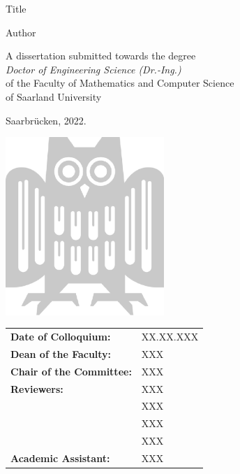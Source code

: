 \begin{titlepage}
\begin{center}
	\vspace*{2em}
	\huge{Title}
	\vspace*{0.75em}
	
	\LARGE{Author}
	\vspace*{2.5em}
	
	{\Large
	A dissertation submitted towards the degree\\[4px]
	\emph{Doctor of Engineering Science (Dr.-Ing.)}\\[6px]
	of the Faculty of Mathematics and Computer Science\\ 
	of Saarland University
	\vspace*{2.5em}
	
	Saarbr\"ucken, 2022.
	}
	\vspace*{2em}
	
	\includegraphics[width=6cm]{uds.png}
\end{center}

\newpage
\thispagestyle{empty}
\vspace*{\fill}
\begin{center}\normalsize
	\begin{tabular}{l@{\hskip 1cm}l}
	\bfseries Date of Colloquium: & XX.XX.XXX\\
	\bfseries Dean of the Faculty: & XXX\\
	\bfseries Chair of the Committee: & XXX\\
	\bfseries Reviewers: & XXX\\
	& XXX\\
	& XXX\\
	& XXX\\
	\bfseries Academic Assistant: & XXX\\
	\end{tabular}
\end{center}
\end{titlepage}



